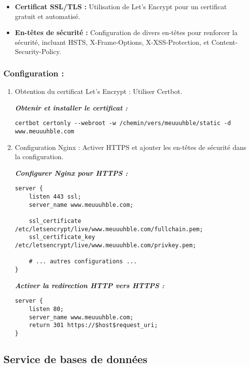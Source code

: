 \begin{itemize}
	\item \textbf{Certificat SSL/TLS :} Utilisation de Let's Encrypt pour un certificat gratuit et automatisé.
	\item \textbf{En-têtes de sécurité :} Configuration de divers en-têtes pour renforcer la sécurité, incluant HSTS, X-Frame-Options, X-XSS-Protection, et Content-Security-Policy.
\end{itemize}

\subsubsection*{Configuration :}

\begin{enumerate}
	\item Obtention du certificat Let's Encrypt : Utiliser Certbot.
	
\textbf{\textit{Obtenir et installer le certificat :}}
	\begin{lstlisting}
certbot certonly --webroot -w /chemin/vers/meuuuhble/static -d www.meuuuhble.com
	\end{lstlisting}

	\item Configuration Nginx : Activer HTTPS et ajouter les en-têtes de sécurité dans la configuration.
	
	
\textbf{\textit{Configurer Nginx pour HTTPS :}}	
	\begin{lstlisting}[style=tf]
server {
	listen 443 ssl;
	server_name www.meuuuhble.com;
	
	ssl_certificate /etc/letsencrypt/live/www.meuuuhble.com/fullchain.pem;
	ssl_certificate_key /etc/letsencrypt/live/www.meuuuhble.com/privkey.pem;
	
	# ... autres configurations ...
}
	\end{lstlisting}

\textbf{\textit{Activer la redirection HTTP vers HTTPS :}}
\begin{lstlisting}[style=tf]
server {
	listen 80;
	server_name www.meuuuhble.com;
	return 301 https://$host$request_uri;
}
\end{lstlisting}
	
\end{enumerate}

\subsection{Service de bases de données}

